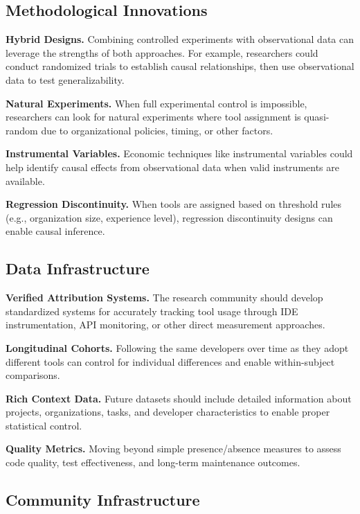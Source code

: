 \documentclass[conference]{IEEEtran}
\begin{document}
\subsection{Methodological Innovations}

\textbf{Hybrid Designs.} Combining controlled experiments with observational data can leverage the strengths of both approaches. For example, researchers could conduct randomized trials to establish causal relationships, then use observational data to test generalizability.

\textbf{Natural Experiments.} When full experimental control is impossible, researchers can look for natural experiments where tool assignment is quasi-random due to organizational policies, timing, or other factors.

\textbf{Instrumental Variables.} Economic techniques like instrumental variables could help identify causal effects from observational data when valid instruments are available.

\textbf{Regression Discontinuity.} When tools are assigned based on threshold rules (e.g., organization size, experience level), regression discontinuity designs can enable causal inference.

\subsection{Data Infrastructure}

\textbf{Verified Attribution Systems.} The research community should develop standardized systems for accurately tracking tool usage through IDE instrumentation, API monitoring, or other direct measurement approaches.

\textbf{Longitudinal Cohorts.} Following the same developers over time as they adopt different tools can control for individual differences and enable within-subject comparisons.

\textbf{Rich Context Data.} Future datasets should include detailed information about projects, organizations, tasks, and developer characteristics to enable proper statistical control.

\textbf{Quality Metrics.} Moving beyond simple presence/absence measures to assess code quality, test effectiveness, and long-term maintenance outcomes.

\subsection{Community Infrastructure}
\end{document}
